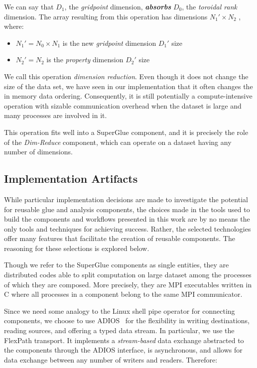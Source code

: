 \documentclass[conference]{IEEEtran}
\begin{document}
We can say that $D_1$, the {\em gridpoint} dimension, \textbf{\em absorbs}
$D_0$, the {\em toroidal rank} dimension. The array resulting from this
operation has dimensions $N_1'{\times}N_2$ , where:

\begin{itemize}

\item $N_1' = N_0{\times}N_1$ is the new {\em gridpoint} dimension $D_1'$ size

\item $N_2' = N_2$ is the {\em property} dimension $D_2'$ size

\end{itemize}

We call this operation {\em dimension reduction}. Even though it does not
change the size of the data set, we have seen in our implementation 
that it often changes the in memory
data ordering. Consequently, it is still potentially a
compute-intensive operation with sizable communication overhead
when the dataset is large and many
processes are involved in it.

This operation fits well into a
SuperGlue component, and it is precisely the role of the {\em Dim-Reduce}
component, which can operate on a dataset having any number of dimensions.

\subsection{Implementation Artifacts}

While particular implementation decisions are made to investigate the
potential for reusable glue and analysis
components, the choices made in the tools used to build the components and
workflows presented in this work are by no means the only tools and techniques for
achieving success. Rather, the selected technologies offer many features that
facilitate the creation of reusable components. The reasoning for these selections is
explored below.

Though we refer to the SuperGlue components as single entities,
they are distributed
codes able to split computation on large dataset
among the processes of which they are
composed. More precisely, they are MPI executables written in C
where all processes in a component belong to the same MPI communicator.

Since we need some analogy to the Linux shell pipe operator for
connecting components, we choose to use ADIOS~\cite{lofstead:2009:adaptable}
for the flexibility in writing destinations, reading sources, and offering a
typed data stream. In particular, we use the FlexPath transport. It implements
a {\em stream-based} data exchange abstracted to the components through the
ADIOS interface, is asynchronous, and allows for data exchange between any
number of writers and readers. Therefore:
\end{document}
